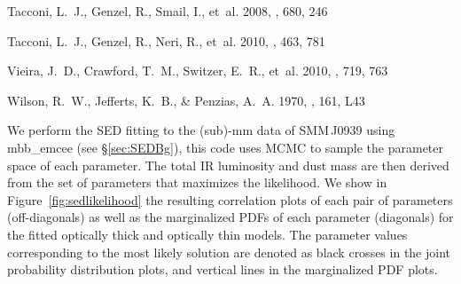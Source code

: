 \documentclass[iop]{emulateapj}
\begin{document}
\begin{thebibliography}{}
{Tacconi}, L.~J., {Genzel}, R., {Smail}, I., {et~al.} 2008, \apj, 680, 246

{Tacconi}, L.~J., {Genzel}, R., {Neri}, R., {et~al.} 2010, \nat, 463, 781

{Vieira}, J.~D., {Crawford}, T.~M., {Switzer}, E.~R., {et~al.} 2010, \apj, 719,
  763

{Wilson}, R.~W., {Jefferts}, K.~B., \& {Penzias}, A.~A. 1970, \apjl, 161, L43

\end{thebibliography}

\appendix
We perform the SED fitting to the (sub)-mm data of SMM\,J0939 using {\sc mbb\_emcee} (see \S \ref{sec:SEDBg}), this code uses MCMC to sample the parameter space of each parameter. The total IR luminosity and dust mass are then derived from the set of parameters that maximizes the likelihood.
We show in Figure~\ref{fig:sedlikelihood} the resulting correlation plots of each pair of parameters (off-diagonals) as well as the marginalized PDFs of each parameter (diagonals) for the fitted optically thick and optically thin models.
The parameter values corresponding to the most likely solution are denoted as black crosses in the joint probability distribution plots, and vertical lines in the marginalized PDF plots. \par
\end{document}

